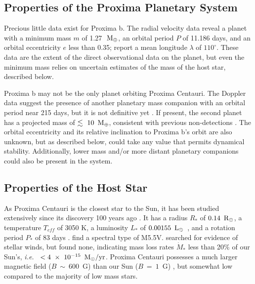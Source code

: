 \documentclass[preprint,12pt]{aastex}
\newcommand{\xxx}[1]{{\color{red} #1}} %
\def\mearth{{\rm\,M_\oplus}}
\def\msun{{\rm\,M_\odot}}
\def\rsun{{\rm\,R_\odot}}
\def\lsun{{\rm\,L_\odot}}
\def\ie{{\it i.e.\ }}
\begin{document}
\subsection{Properties of the Proxima Planetary System}
\label{sec:obs:planetsys}
Precious little data exist for Proxima b. The radial velocity data
reveal a planet with a minimum mass $m$ of 1.27~$\mearth$, an orbital period $P$
of 11.186 days, and an orbital eccentricity $e$ less than 0.35;
\cite{AngladaEscude16} report a mean longitude $\lambda$ of $110^\circ$. These
data are the extent of the direct observational data on the planet,
but even the minimum mass relies on uncertain estimates of the mass of
the host star, described below.

Proxima b may not be the only planet orbiting Proxima
Centauri. The Doppler data suggest the presence of another planetary
mass companion with an orbital period near 215 days, but it is not
definitive yet \citep{AngladaEscude16}. If present, the \xxx{second} planet has a
projected mass of $\lesssim~10~\mearth$, consistent with previous
non-detections \citep{EndlKurster08,Barnes14,Lurie14}. The orbital
eccentricity and its relative inclination to Proxima b's orbit are also
unknown, but as described below, could take any value that permits
dynamical stability. Additionally, lower mass and/or more distant
planetary companions could also be present in the system.

\subsection{Properties of the Host Star}
\label{sec:obs:star}
As Proxima Centauri is the closest star to the Sun, it has been studied
extensively since its discovery 100 years ago \citep{Innes1915}.  It
has a radius $R_*$ of $0.14~\rsun$, a temperature $T_{eff}$ of 3050 K, a
luminosity $L_*$ of $0.00155~\lsun$~\citep{Boyajian12}, and a rotation
period $P_*$ of 83 days \citep{Benedict98}. \cite{AngladaEscude16} find a 
spectral type of M5.5V. \cite{Wood01} searched for
evidence of stellar winds, but found none, indicating mass loss rates
$\dot{M}_*$ less than 20\% of our Sun's, \ie
$<4~\times~10^{-15}~\msun/\textrm{yr}$. Proxima Centauri possesses a
much larger magnetic field ($B~\sim~600$~G) than our Sun ($B~=~1$~G)
\citep{ReinersBasri08}, but somewhat low compared to the majority of
low mass stars. 
\end{document}
